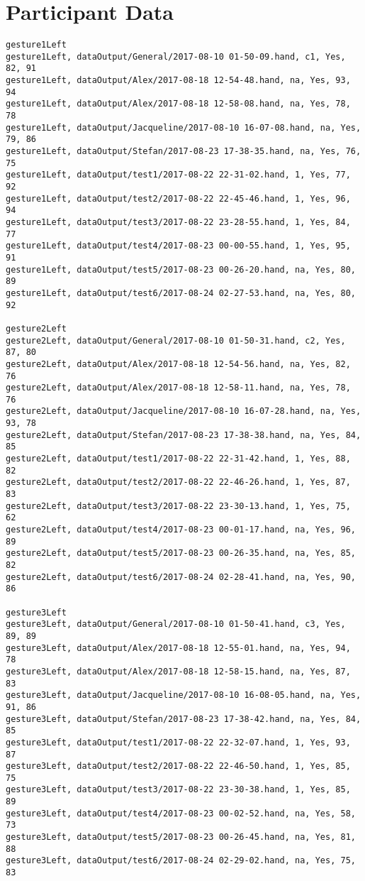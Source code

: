\chapter{Participant Data}

\label{Appendix_dataAvgs} 
\begin{verbatim}
gesture1Left
gesture1Left, dataOutput/General/2017-08-10 01-50-09.hand, c1, Yes, 82, 91
gesture1Left, dataOutput/Alex/2017-08-18 12-54-48.hand, na, Yes, 93, 94
gesture1Left, dataOutput/Alex/2017-08-18 12-58-08.hand, na, Yes, 78, 78
gesture1Left, dataOutput/Jacqueline/2017-08-10 16-07-08.hand, na, Yes, 79, 86
gesture1Left, dataOutput/Stefan/2017-08-23 17-38-35.hand, na, Yes, 76, 75
gesture1Left, dataOutput/test1/2017-08-22 22-31-02.hand, 1, Yes, 77, 92
gesture1Left, dataOutput/test2/2017-08-22 22-45-46.hand, 1, Yes, 96, 94
gesture1Left, dataOutput/test3/2017-08-22 23-28-55.hand, 1, Yes, 84, 77
gesture1Left, dataOutput/test4/2017-08-23 00-00-55.hand, 1, Yes, 95, 91
gesture1Left, dataOutput/test5/2017-08-23 00-26-20.hand, na, Yes, 80, 89
gesture1Left, dataOutput/test6/2017-08-24 02-27-53.hand, na, Yes, 80, 92

gesture2Left
gesture2Left, dataOutput/General/2017-08-10 01-50-31.hand, c2, Yes, 87, 80
gesture2Left, dataOutput/Alex/2017-08-18 12-54-56.hand, na, Yes, 82, 76
gesture2Left, dataOutput/Alex/2017-08-18 12-58-11.hand, na, Yes, 78, 76
gesture2Left, dataOutput/Jacqueline/2017-08-10 16-07-28.hand, na, Yes, 93, 78
gesture2Left, dataOutput/Stefan/2017-08-23 17-38-38.hand, na, Yes, 84, 85
gesture2Left, dataOutput/test1/2017-08-22 22-31-42.hand, 1, Yes, 88, 82
gesture2Left, dataOutput/test2/2017-08-22 22-46-26.hand, 1, Yes, 87, 83
gesture2Left, dataOutput/test3/2017-08-22 23-30-13.hand, 1, Yes, 75, 62
gesture2Left, dataOutput/test4/2017-08-23 00-01-17.hand, na, Yes, 96, 89
gesture2Left, dataOutput/test5/2017-08-23 00-26-35.hand, na, Yes, 85, 82
gesture2Left, dataOutput/test6/2017-08-24 02-28-41.hand, na, Yes, 90, 86

gesture3Left
gesture3Left, dataOutput/General/2017-08-10 01-50-41.hand, c3, Yes, 89, 89
gesture3Left, dataOutput/Alex/2017-08-18 12-55-01.hand, na, Yes, 94, 78
gesture3Left, dataOutput/Alex/2017-08-18 12-58-15.hand, na, Yes, 87, 83
gesture3Left, dataOutput/Jacqueline/2017-08-10 16-08-05.hand, na, Yes, 91, 86
gesture3Left, dataOutput/Stefan/2017-08-23 17-38-42.hand, na, Yes, 84, 85
gesture3Left, dataOutput/test1/2017-08-22 22-32-07.hand, 1, Yes, 93, 87
gesture3Left, dataOutput/test2/2017-08-22 22-46-50.hand, 1, Yes, 85, 75
gesture3Left, dataOutput/test3/2017-08-22 23-30-38.hand, 1, Yes, 85, 89
gesture3Left, dataOutput/test4/2017-08-23 00-02-52.hand, na, Yes, 58, 73
gesture3Left, dataOutput/test5/2017-08-23 00-26-45.hand, na, Yes, 81, 88
gesture3Left, dataOutput/test6/2017-08-24 02-29-02.hand, na, Yes, 75, 83


\end{verbatim}
